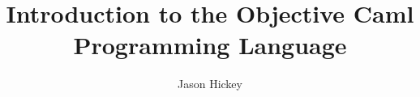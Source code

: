 \documentclass[12pt]{book}
\title{Introduction to the Objective Caml Programming Language}
\author{Jason Hickey}
\begin{document}
\maketitle
\tableofcontents

\sloppy






\printindex
\end{document}
